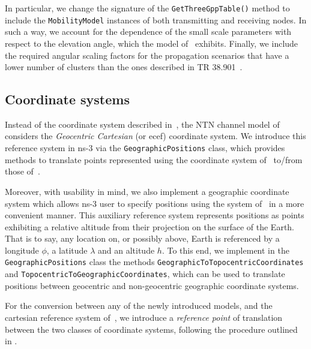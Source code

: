 In particular, we change the signature of the \texttt{GetThreeGppTable()} method to include the \texttt{Mobility\-Model} instances of both transmitting and receiving nodes. In such a way, we account for the dependence of the small scale parameters with respect to the elevation angle, which the model of~\cite{38811} exhibits.
Finally, we include the required angular scaling factors for the propagation scenarios that have a lower number of clusters than the ones described in TR 38.901~\cite{TR38901}.

\subsection{Coordinate systems}
Instead of the coordinate system described in~\cite{TR38901}, the NTN channel model of~\cite{38811} considers the \emph{Geocentric Cartesian} (or \gls{ecef}) coordinate system.
We introduce this reference system in ns-3 via the \texttt{Geographic\-Positions} class, which provides methods to translate points represented using the coordinate system of~\cite{TR38901} to/from those of~\cite{38811}. 

Moreover, with usability in mind, we also implement a geographic coordinate system which allows ns-3 user to specify positions using the system of~\cite{38811} in a more convenient manner. This auxiliary reference system represents positions as points exhibiting a relative altitude from their projection on the surface of the Earth. That is to say, any location on, or possibly above, Earth is referenced by a longitude $\phi$, a latitude $\lambda$ and an altitude $h$. 
To this end, we implement in the \texttt{Geographic\-Positions} class the methods \texttt{Geographic\-To\-Topocentric\-Coordinates} and \texttt{Topocentric\-To\-Geographic\-Coordinates}, which can be used to translate positions between geocentric and non-geocentric geographic coordinate systems.

For the conversion between any of the newly introduced models, and the cartesian reference system of~\cite{TR38901}, we introduce a \emph{reference point} of translation between the two classes of coordinate systems, following the procedure outlined in \cite[Ch.~4]{coordinateconversion}.

